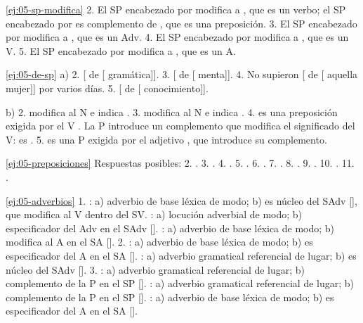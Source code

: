 \begin{solucion}{\ref{ej:05-sp-modifica}}
2. El SP encabezado por  modifica a , que es un
verbo; el SP encabezado por  es complemento de , que es
una preposición. 3. El SP encabezado por  modifica a ,
que es un Adv. 4. El SP encabezado por  modifica a , que
es un V. 5. El SP encabezado por  modifica a , que es un
A.
\end{solucion}

\begin{solucion}{\ref{ej:05-de-sp}}
a) 2. [ de [ gramática]]. 3. [
de [ menta]]. 4. No supieron [
de [ aquella mujer]] por varios días.
5. [ de [ conocimiento]].

b) 2.  modifica al N  e indica . 3. 
modifica al N  e indica . 4.
 es una preposición exigida por el V . La P introduce un
complemento que modifica el significado del V:  es
. 5.  es una P exigida por el
adjetivo , que introduce su complemento.
\end{solucion}

\begin{solucion}{\ref{ej:05-preposiciones}}
Respuestas posibles: 2. . 3. . 4.
. 5. . 6. . 7.
. 8. . 9. . 10. . 11. .
\end{solucion}

\begin{solucion}{\ref{ej:05-adverbios}}
1. : a) adverbio de base léxica de modo; b) es núcleo del
SAdv [], que modifica al V dentro del SV. :
a) locución adverbial de modo; b) especificador del Adv 
en el SAdv []. : a)
adverbio de base léxica de modo; b) modifica al A  en el SA
[]. 2. : a) adverbio de
base léxica de modo; b) es especificador del A en el SA []. : a) adverbio gramatical referencial de lugar; b)
es núcleo del SAdv []. 3.
: a) adverbio gramatical referencial de lugar; b) complemento de
la P  en el SP []. : a) adverbio
gramatical referencial de lugar; b) complemento de la P  en el SP
[]. : a) adverbio de base léxica de
modo; b) es especificador del A en el SA [].
\end{solucion}

